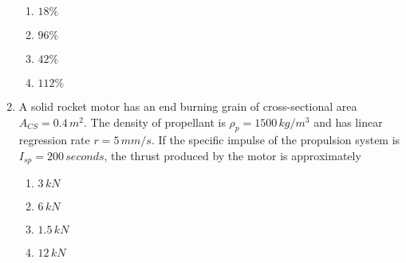 \documentclass[journal]{IEEEtran}
\begin{document}
\begin{enumerate}
    \begin{enumerate}
        \item $18\%$
        \item $96\%$
        \item $42\%$
        \item $112\%$
    \end{enumerate}
    \item A solid rocket motor has an end burning grain of cross-sectional area $A_{CS}=0.4\,m^2$. The density of propellant is $\rho_p=1500\,kg/m^3$ and has linear regression rate $r=5\,mm/s$. If the specific impulse of the propulsion system is $I_{sp}=200\,seconds$, the thrust  produced by the motor is approximately
    \begin{enumerate}
        \item $3\,kN$
        \item $6\,kN$
        \item $1.5\,kN$
        \item $12\,kN$
    \end{enumerate}
\end{enumerate}
\end{document}
